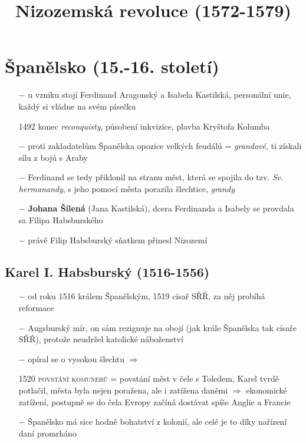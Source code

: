 \documentclass{article}
\title{\vspace{-2cm}Nizozemská revoluce (1572-1579)\vspace{-1.7cm}}
\date{}
\author{}
\begin{document}
\maketitle

\section*{Španělsko (15.-16. století)}

\begin{itemize}
    \vspace{-0.5em}
    \setlength\itemsep{0.15em}
    \item[$-$] u vzniku stojí Ferdinand Aragonský a Isabela Kastilská, personální unie, každý si vládne na svém písečku
    \item[1492] konec \textit{reconquisty}, působení inkvizice, plavba Kryštofa Kolumba
    \item[$-$] proti zakladatelům Španělska opozice velkých feudálů = \textit{grandové}, ti získali sílu z bojů s Araby
    \item[$-$] Ferdinand se tedy přiklonil na stranu měst, která se spojila do tzv. \textit{Sv. hermanandy}, s jeho pomocí města porazila šlechtice, \textit{grandy}
    \item[$-$] \textbf{Johana Šílená} (Jana Kastilská), dcera Ferdinanda a Isabely se provdala sa Filipa Habsburského
    \item[$-$] právě Filip Habsburský sňatkem přinesl Nizozemí
\end{itemize}

\subsection*{Karel I. Habsburský (1516-1556)}
\begin{itemize}
    \vspace{-0.5em}
    \setlength\itemsep{0.15em}
    \item[$-$] od roku 1516 králem Španělským, 1519 císař SŘŘ, za něj probíhá reformace
    \item[$-$] Augsburský mír, on sám rezignuje na obojí (jak krále Španělska tak císaře SŘŘ), protože neudržel katolické náboženství
    \item[$-$] opíral se o vysokou šlechtu $\Rightarrow$
    \item[1520] \textsc{povstání komunerů} = povstání měst v čele s Toledem, Karel tvrdě potlačil, města byla nejen poražena, ale i zatížena daněmi $\Rightarrow$ ekonomické zatížení, postupně se do čela Evropy začíná dostávat spíše Anglie a Francie
    \item[$-$] Španělsko má sice hodně bohatství z kolonií, ale celé je to díky nařízení daní promrháno
\end{itemize}
\end{document}
